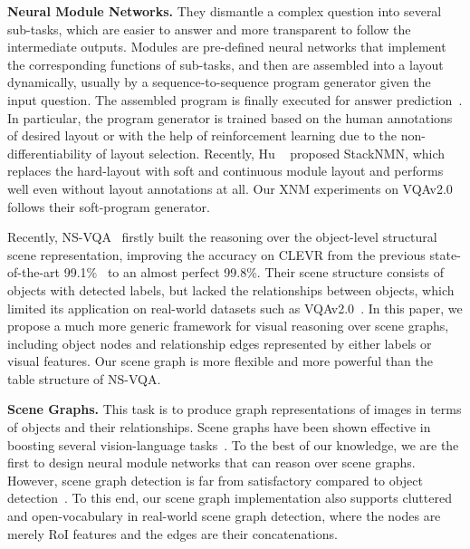 \documentclass[10pt,twocolumn,letterpaper]{article}
\begin{document}
\textbf{Neural Module Networks.} They dismantle a complex question into several sub-tasks, which are easier to answer and more transparent to follow the intermediate outputs. Modules are pre-defined neural networks that implement the corresponding functions of sub-tasks, and then are assembled into a layout dynamically, usually by a sequence-to-sequence program generator given the input question. The assembled program is finally executed for answer prediction~\cite{hu2017learning,johnson2017inferring,mascharka2018transparency}. In particular, the program generator is trained based on the human annotations of desired layout or with the help of reinforcement learning due to the non-differentiability of layout selection. Recently, Hu \etal~\cite{hu2018explainable} proposed StackNMN, which replaces the hard-layout with soft and continuous module layout and performs well even without layout annotations at all. Our XNM experiments on VQAv2.0 follows their soft-program generator. 

Recently, NS-VQA~\cite{yi2018nsvqa} firstly built the reasoning over the object-level structural scene representation, improving the accuracy on CLEVR from the previous state-of-the-art 99.1\%~\cite{mascharka2018transparency} to an almost perfect 99.8\%. Their scene structure consists of objects with detected labels, but lacked the relationships between objects, which limited its application on real-world datasets such as VQAv2.0~\cite{goyal2017vqa2}. In this paper, we propose a much more generic framework for visual reasoning over scene graphs, including object nodes and relationship edges represented by either labels or visual features. Our scene graph is more flexible and more powerful than the table structure of NS-VQA.

\textbf{Scene Graphs.} This task is to produce graph representations of images in terms of objects and their relationships. Scene graphs have been shown effective in boosting several vision-language tasks~\cite{johnson2015image,teney2017graph,yin2017obj2text,chen2018scene}. To the best of our knowledge, we are the first to design neural module networks that can reason over scene graphs. However, scene graph detection is far from satisfactory compared to object detection~\cite{xu2017scene,zellers2018motifs,li2018factorizable}. To this end, our scene graph implementation also supports cluttered and open-vocabulary in real-world scene graph detection, where the nodes are merely RoI features and the edges are their concatenations. 
\end{document}
